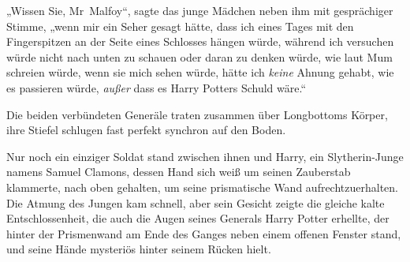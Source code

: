 „Wissen Sie, Mr~Malfoy“, sagte das junge Mädchen neben ihm mit gesprächiger Stimme, „wenn mir ein Seher gesagt hätte, dass ich eines Tages mit den Fingerspitzen an der Seite eines Schlosses hängen würde, während ich versuchen würde nicht nach unten zu schauen oder daran zu denken würde, wie laut Mum schreien würde, wenn sie mich sehen würde, hätte ich \emph{keine} Ahnung gehabt, wie es passieren würde, \emph{außer} dass es Harry Potters Schuld wäre.“


Die beiden verbündeten Generäle traten zusammen über Longbottoms Körper, ihre Stiefel schlugen fast perfekt synchron auf den Boden.

Nur noch ein einziger Soldat stand zwischen ihnen und Harry, ein Slytherin-Junge namens Samuel Clamons, dessen Hand sich weiß um seinen Zauberstab klammerte, nach oben gehalten, um seine prismatische Wand aufrechtzuerhalten. Die Atmung des Jungen kam schnell, aber sein Gesicht zeigte die gleiche kalte Entschlossenheit, die auch die Augen seines Generals Harry Potter erhellte, der hinter der Prismenwand am Ende des Ganges neben einem offenen Fenster stand, und seine Hände mysteriös hinter seinem Rücken hielt.

